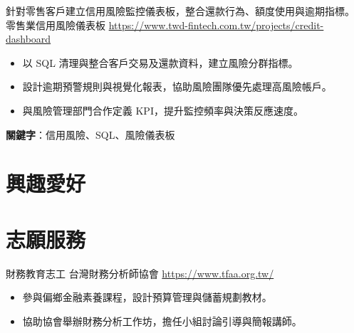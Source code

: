\documentclass[a4paper, serif, 10pt]{moderncv}
\begin{document}
        {針對零售客戶建立信用風險監控儀表板，整合還款行為、額度使用與逾期指標。}
        {零售業信用風險儀表板}
        {\url{https://www.twd-fintech.com.tw/projects/credit-dashboard}}
        {}
        {\begin{itemize}
\item 以 SQL 清理與整合客戶交易及還款資料，建立風險分群指標。
\item 設計逾期預警規則與視覺化報表，協助風險團隊優先處理高風險帳戶。
\item 與風險管理部門合作定義 KPI，提升監控頻率與決策反應速度。
\end{itemize}
\textbf{關鍵字}：信用風險、SQL、風險儀表板}
\section{興趣愛好}

\section{志願服務}

        {財務教育志工}
        {台灣財務分析師協會}
        {\url{https://www.tfaa.org.tw/}}
        {}
        {\begin{itemize}
\item 參與偏鄉金融素養課程，設計預算管理與儲蓄規劃教材。
\item 協助協會舉辦財務分析工作坊，擔任小組討論引導與簡報講師。
\end{itemize}}
    
\end{document}
